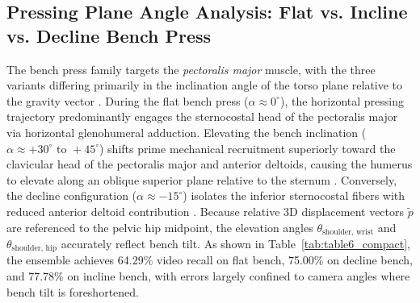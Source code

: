 \documentclass[preprint,12pt]{elsarticle}
\begin{document}
\subsection{Pressing Plane Angle Analysis: Flat vs. Incline vs. Decline Bench Press}
The bench press family targets the \textit{pectoralis major} muscle, with the three variants differing primarily in the inclination angle of the torso plane relative to the gravity vector \cite{barnett1995,trebs2010}. During the flat bench press ($\alpha \approx 0^\circ$), the horizontal pressing trajectory predominantly engages the sternocostal head of the pectoralis major via horizontal glenohumeral adduction. Elevating the bench inclination ($\alpha \approx +30^\circ \text{ to } +45^\circ$) shifts prime mechanical recruitment superiorly toward the clavicular head of the pectoralis major and anterior deltoids, causing the humerus to elevate along an oblique superior plane relative to the sternum \cite{trebs2010}. Conversely, the decline configuration ($\alpha \approx -15^\circ$) isolates the inferior sternocostal fibers with reduced anterior deltoid contribution \cite{barnett1995}. Because relative 3D displacement vectors $\tilde{p}$ are referenced to the pelvic hip midpoint, the elevation angles $\theta_{\text{shoulder, wrist}}$ and $\theta_{\text{shoulder, hip}}$ accurately reflect bench tilt. As shown in Table~\ref{tab:table6_compact}, the ensemble achieves 64.29\% video recall on flat bench, 75.00\% on decline bench, and 77.78\% on incline bench, with errors largely confined to camera angles where bench tilt is foreshortened.
\end{document}
